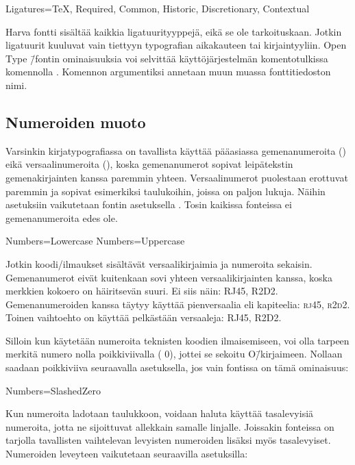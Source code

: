 \begin{koodilohkosis}
  Ligatures={TeX, Required, Common, Historic, Discretionary,
    Contextual}
\end{koodilohkosis}

Harva fontti sisältää kaikkia ligatuurityyppejä, eikä se ole
tarkoituskaan. Jotkin ligatuurit kuuluvat vain tiettyyn typografian
aikakauteen tai kirjaintyyliin. Open Type \=/fontin ominaisuuksia voi
selvittää käyttöjärjestelmän komentotulkissa komennolla
. Komennon argumentiksi annetaan muun muassa
fonttitiedoston nimi.

\subsection{Numeroiden muoto}
\label{luku:fontit_numerot}

Varsinkin kirjatypografiassa on tavallista käyttää pääasiassa
gemenanumeroita ({}) eikä versaalinumeroita
({}), koska gemenanumerot sopivat leipätekstin
gemenakirjainten kanssa paremmin yhteen. Versaalinumerot puolestaan
erottuvat paremmin ja sopivat esimerkiksi taulukoihin, joissa on paljon
lukuja. Näihin asetuksiin vaikutetaan fontin asetuksella
. Tosin kaikissa fonteissa ei gemenanumeroita edes ole.

\begin{koodilohkosis}
  Numbers=Lowercase %
  Numbers=Uppercase %
\end{koodilohkosis}

Jotkin koodi\-/ilmaukset sisältävät versaalikirjaimia ja numeroita
sekaisin. Gemenanumerot eivät kuitenkaan sovi yhteen versaalikirjainten
kanssa, koska merkkien kokoero on häiritsevän suuri. Ei siis näin:
RJ45, R2D2. Gemenanumeroiden kanssa täytyy käyttää pienversaalia eli
kapiteelia: \textsc{rj45}, \textsc{r2d2}. Toinen vaihtoehto on käyttää
pelkästään versaaleja: {\versaalinum RJ45, R2D2}.

Silloin kun käytetään numeroita teknisten koodien ilmaisemiseen, voi
olla tarpeen merkitä numero nolla poikkiviivalla
({ 0}), jottei se
sekoitu O\=/kirjaimeen. Nollaan saadaan poikkiviiva seuraavalla
asetuksella, jos vain fontissa on tämä ominaisuus:

\begin{koodilohkosis}
  Numbers=SlashedZero
\end{koodilohkosis}

Kun numeroita ladotaan taulukkoon, voidaan haluta käyttää tasalevyisiä
numeroita, jotta ne sijoittuvat allekkain samalle linjalle. Joissakin
fonteissa on tarjolla tavallisten vaihtelevan levyisten numeroiden
lisäksi myös tasalevyiset. Numeroiden leveyteen vaikutetaan seuraavilla
asetuksilla:


